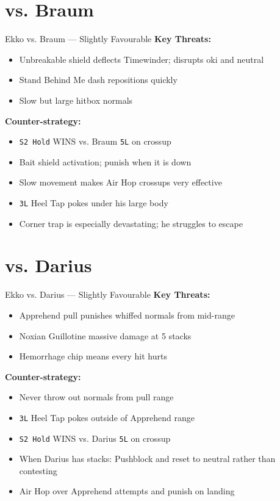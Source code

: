 \documentclass[12pt, a4paper]{report}
\newcommand{\notation}[1]{{\small\texttt{\textcolor{ekkoBlue}{#1}}}}
\newcommand{\champ}[1]{\textcolor{ekkoAccent}{\textbf{#1}}}
\begin{document}
\section{vs. \champ{Braum}}

\begin{matchupbox}[]{Ekko vs. Braum --- Slightly Favourable}
\textbf{Key Threats:}
\begin{itemize}
  \item Unbreakable shield deflects Timewinder; disrupts oki and neutral
  \item Stand Behind Me dash repositions quickly
  \item Slow but large hitbox normals
\end{itemize}
\textbf{Counter-strategy:}
\begin{itemize}
  \item \notation{S2 Hold} WINS vs. Braum \notation{5L} on crossup
  \item Bait shield activation; punish when it is down
  \item Slow movement makes Air Hop crossups very effective
  \item \notation{3L} Heel Tap pokes under his large body
  \item Corner trap is especially devastating; he struggles to escape
\end{itemize}
\end{matchupbox}

\section{vs. \champ{Darius}}

\begin{matchupbox}[]{Ekko vs. Darius --- Slightly Favourable}
\textbf{Key Threats:}
\begin{itemize}
  \item Apprehend pull punishes whiffed normals from mid-range
  \item Noxian Guillotine massive damage at 5 stacks
  \item Hemorrhage chip means every hit hurts
\end{itemize}
\textbf{Counter-strategy:}
\begin{itemize}
  \item Never throw out normals from pull range
  \item \notation{3L} Heel Tap pokes outside of Apprehend range
  \item \notation{S2 Hold} WINS vs. Darius \notation{5L} on crossup
  \item When Darius has stacks: Pushblock and reset to neutral rather than contesting
  \item Air Hop over Apprehend attempts and punish on landing
\end{itemize}
\end{matchupbox}
\end{document}
